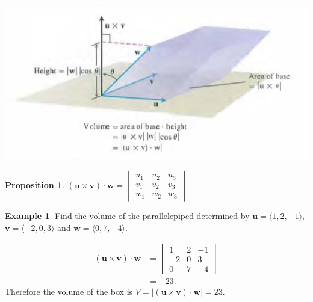 \documentclass[12pt, letter]{article}
\theoremstyle{plain}
\newtheorem{proposition}[theorem]{Proposition}
\numberwithin{theorem}{section}
\theoremstyle{definition}
\newtheorem{example}[theorem]{Example}
\begin{document}
\bigskip

\begin{center}
\includegraphics[scale=0.8]{m1_f14}
\end{center}

\bigskip

\begin{proposition}
$(\bm{u} \times \bm{v}) \cdot \bm{w} = \begin{vmatrix} u_1 & u_2 & u_3 \\ v_1 & v_2 & v_3 \\ w_1 & w_2 & w_3 \end{vmatrix}$
\end{proposition}

\bigskip

\hrulefill

\bigskip

\begin{example}
Find the volume of the parallelepiped determined by $\bm{u} = \langle 1, 2, -1 \rangle$, $\bm{v} = \langle -2, 0, 3 \rangle$ and $\bm{w} = \langle 0, 7, -4 \rangle$.\\

\smallskip

\begin{align*}
(\bm{u} \times \bm{v}) \cdot \bm{w} &= \begin{vmatrix} 1 & 2 & -1 \\ -2 & 0 & 3 \\ 0 & 7 & -4 \end{vmatrix}\\
&= -23.
\end{align*}
Therefore the volume of the box is $V = |(\bm{u} \times \bm{v}) \cdot \bm{w}| = 23$.
\end{example}

\newpage

\end{document}
